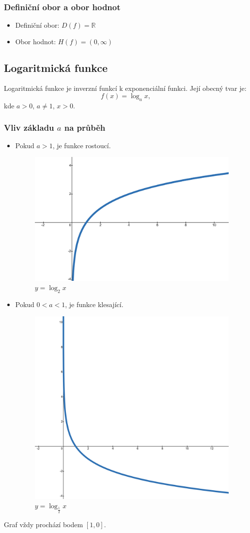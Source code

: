 \subsubsection{Definiční obor a obor hodnot}
\begin{itemize}
    \item Definiční obor: $D(f) = \mathbb{R}$
    \item Obor hodnot: $H(f) = (0, \infty)$
\end{itemize}

\subsection{Logaritmická funkce}
Logaritmická funkce je inverzní funkcí k exponenciální funkci. Její obecný tvar je:
$$
f(x) = \log_a x,
$$
kde $a > 0$, $a \ne 1$, $x > 0$.

\subsubsection{Vliv základu $a$ na průběh}
\begin{itemize}
    \item Pokud $a > 1$, je funkce rostoucí.
\begin{figure}
        \centering
        \includegraphics[width=0.5\linewidth]{img/5_log_ros.png}
        \caption{$y=\log_2 x
$}
    \end{figure}
        \item Pokud $0 < a < 1$, je funkce klesající.
\begin{figure}
    \centering
    \includegraphics[width=0.5\linewidth]{img/5_log_kles.png}
    \caption{$y=\log_{\frac{1}{2}} x
$}
\end{figure}
\end{itemize}
Graf vždy prochází bodem $[1, 0]$.
